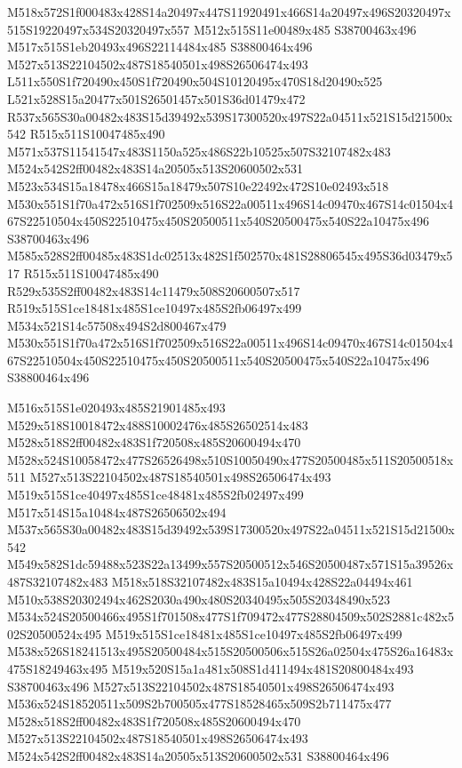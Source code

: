 \documentclass{article}
\begin{document}
\begin{multicols}{2}
M518x572S1f000483x428S14a20497x447S11920491x466S14a20497x496S20320497x515S19220497x534S20320497x557 M512x515S11e00489x485 S38700463x496 M517x515S1eb20493x496S22114484x485 S38800464x496 M527x513S22104502x487S18540501x498S26506474x493 L511x550S1f720490x450S1f720490x504S10120495x470S18d20490x525 L521x528S15a20477x501S26501457x501S36d01479x472 R537x565S30a00482x483S15d39492x539S17300520x497S22a04511x521S15d21500x542 R515x511S10047485x490 M571x537S11541547x483S1150a525x486S22b10525x507S32107482x483 M524x542S2ff00482x483S14a20505x513S20600502x531 M523x534S15a18478x466S15a18479x507S10e22492x472S10e02493x518 M530x551S1f70a472x516S1f702509x516S22a00511x496S14c09470x467S14c01504x467S22510504x450S22510475x450S20500511x540S20500475x540S22a10475x496 S38700463x496 M585x528S2ff00485x483S1dc02513x482S1f502570x481S28806545x495S36d03479x517 R515x511S10047485x490 R529x535S2ff00482x483S14c11479x508S20600507x517 R519x515S1ce18481x485S1ce10497x485S2fb06497x499 M534x521S14c57508x494S2d800467x479 M530x551S1f70a472x516S1f702509x516S22a00511x496S14c09470x467S14c01504x467S22510504x450S22510475x450S20500511x540S20500475x540S22a10475x496 S38800464x496

M516x515S1e020493x485S21901485x493 M529x518S10018472x488S10002476x485S26502514x483 M528x518S2ff00482x483S1f720508x485S20600494x470 M528x524S10058472x477S26526498x510S10050490x477S20500485x511S20500518x511 M527x513S22104502x487S18540501x498S26506474x493 M519x515S1ce40497x485S1ce48481x485S2fb02497x499 M517x514S15a10484x487S26506502x494 M537x565S30a00482x483S15d39492x539S17300520x497S22a04511x521S15d21500x542 M549x582S1dc59488x523S22a13499x557S20500512x546S20500487x571S15a39526x487S32107482x483 M518x518S32107482x483S15a10494x428S22a04494x461 M510x538S20302494x462S2030a490x480S20340495x505S20348490x523 M534x524S20500466x495S1f701508x477S1f709472x477S28804509x502S2881c482x502S20500524x495 M519x515S1ce18481x485S1ce10497x485S2fb06497x499 M538x526S18241513x495S20500484x515S20500506x515S26a02504x475S26a16483x475S18249463x495 M519x520S15a1a481x508S1d411494x481S20800484x493 S38700463x496 M527x513S22104502x487S18540501x498S26506474x493 M536x524S18520511x509S2b700505x477S18528465x509S2b711475x477 M528x518S2ff00482x483S1f720508x485S20600494x470 M527x513S22104502x487S18540501x498S26506474x493 M524x542S2ff00482x483S14a20505x513S20600502x531 S38800464x496


\end{multicols}
\end{document}
